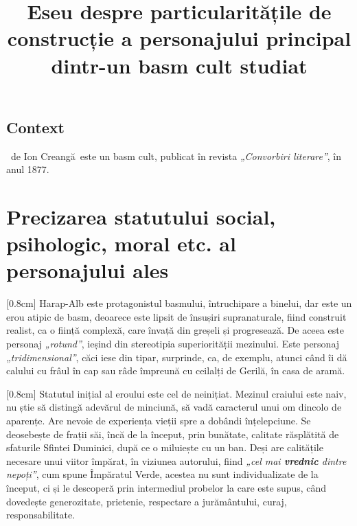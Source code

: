 

\newcommand{\operatitle}{\textbfit{„Povestea lui Harap-Alb”}} %
\newcommand{\operaauthor}{Ion Creangă} %

\title{Eseu despre particularitățile de construcție a personajului principal dintr-un basm cult studiat}



\maketitle %



\subsection{Context}

\operatitle\ de \operaauthor\ este un basm cult, publicat în revista \textit{„Convorbiri literare”}, în anul 1877.


\section{Precizarea statutului social, psihologic, moral etc. al personajului ales}

[0.8cm]
Harap-Alb este protagonistul basmului, întruchipare a binelui, dar este un erou atipic de basm, deoarece este lipsit de însușiri supranaturale, fiind construit realist, ca o ființă complexă, care învață din greșeli și progresează. De aceea este personaj \textit{„rotund”}, ieșind din stereotipia superiorității mezinului. Este personaj \textit{„tridimensional”}, căci iese din tipar, surprinde, ca, de exemplu, atunci când îi dă calului cu frâul în cap sau râde împreună cu ceilalți de Gerilă, în casa de aramă.

[0.8cm]
Statutul inițial al eroului este cel de neinițiat. Mezinul craiului este naiv, nu știe să distingă adevărul de minciună, să vadă caracterul unui om dincolo de aparențe. Are nevoie de experiența vieții spre a dobândi înțelepciune. Se deosebește de frații săi, încă de la început, prin bunătate, calitate răsplătită de sfaturile Sfintei Duminici, după ce o miluiește cu un ban. Deși are calitățile necesare unui viitor împărat, în viziunea autorului, fiind \textit{„cel mai \textbf{vrednic} dintre nepoți”}, cum spune Împăratul Verde, acestea nu sunt individualizate de la început, ci și le descoperă prin intermediul probelor la care este supus, când dovedește generozitate, prietenie, respectare a jurământului, curaj, responsabilitate.

